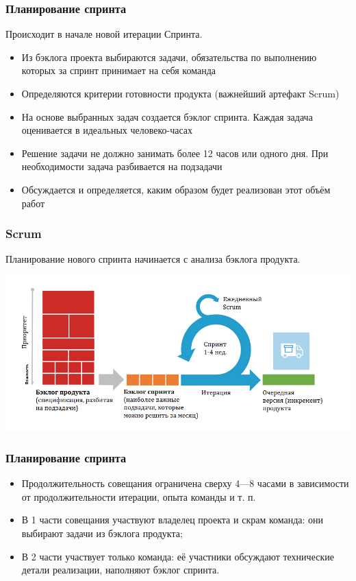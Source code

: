 \documentclass{../industrial-development}
\begin{document}
\begin{frame} \frametitle {Планирование спринта}
Происходит в начале новой итерации Спринта.
\begin{itemize}
\item Из бэклога проекта выбираются задачи, обязательства по выполнению которых за спринт принимает на себя команда
\item Определяются \alert{критерии готовности} продукта (важнейший артефакт Scrum)
\item На основе выбранных задач создается бэклог спринта. Каждая задача оценивается в идеальных человеко-часах
\item Решение задачи не должно занимать более 12 часов или одного дня. При необходимости задача разбивается на подзадачи
\item Обсуждается и определяется, каким образом будет реализован этот объём работ
\end{itemize}
\end{frame}

\begin{frame} \frametitle{Scrum}
Планирование нового спринта начинается с анализа бэклога продукта.
\centerline{\includegraphics[height=0.6\textheight]{scrum.png}}
\end{frame} 

\begin{frame} \frametitle {Планирование спринта}

\begin{itemize}
\item Продолжительность совещания ограничена сверху 4---8 часами в зависимости от продолжительности итерации, опыта команды и т. п.
\item В 1 части совещания участвуют \alert {владелец проекта} и \alert{скрам команда}: они выбирают задачи из бэклога продукта;
\item В 2 части участвует \alert{только команда}: её участники обсуждают технические детали реализации, наполняют бэклог спринта.
\end {itemize}
\end{frame}
\end{document}
